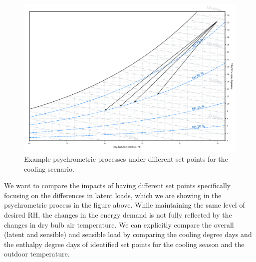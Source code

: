     \begin{figure}[h!]
    \centering
    \includegraphics[width=\textwidth]{coolingcases.png}
    \caption{Example psychrometric processes under different set points for the cooling scenario.}\label{fg:cool}
    \end{figure}


    We want to compare the impacts of having different set points specifically focusing on the differences in latent loads, which we are showing in the psychrometric process in the figure above. While maintaining the same level of desired RH, the changes in the energy demand is not fully reflected by the changes in dry bulb air temperature. We can explicitly compare the overall (latent and sensible) and sensible load by comparing the cooling degree days and the enthalpy degree days of identified set points for the cooling season and the outdoor temperature. 

